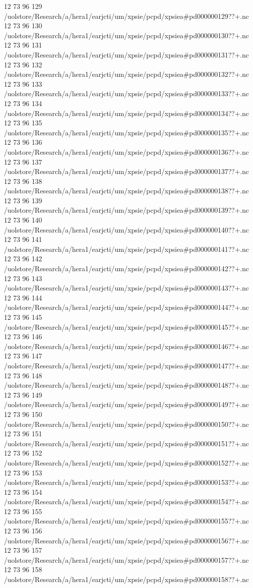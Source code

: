 12 73 96
129
/uolstore/Research/a/hera1/earjcti/um/xpsie/pcpd/xpsiea#pd000000129??+.nc
12 73 96
130
/uolstore/Research/a/hera1/earjcti/um/xpsie/pcpd/xpsiea#pd000000130??+.nc
12 73 96
131
/uolstore/Research/a/hera1/earjcti/um/xpsie/pcpd/xpsiea#pd000000131??+.nc
12 73 96
132
/uolstore/Research/a/hera1/earjcti/um/xpsie/pcpd/xpsiea#pd000000132??+.nc
12 73 96
133
/uolstore/Research/a/hera1/earjcti/um/xpsie/pcpd/xpsiea#pd000000133??+.nc
12 73 96
134
/uolstore/Research/a/hera1/earjcti/um/xpsie/pcpd/xpsiea#pd000000134??+.nc
12 73 96
135
/uolstore/Research/a/hera1/earjcti/um/xpsie/pcpd/xpsiea#pd000000135??+.nc
12 73 96
136
/uolstore/Research/a/hera1/earjcti/um/xpsie/pcpd/xpsiea#pd000000136??+.nc
12 73 96
137
/uolstore/Research/a/hera1/earjcti/um/xpsie/pcpd/xpsiea#pd000000137??+.nc
12 73 96
138
/uolstore/Research/a/hera1/earjcti/um/xpsie/pcpd/xpsiea#pd000000138??+.nc
12 73 96
139
/uolstore/Research/a/hera1/earjcti/um/xpsie/pcpd/xpsiea#pd000000139??+.nc
12 73 96
140
/uolstore/Research/a/hera1/earjcti/um/xpsie/pcpd/xpsiea#pd000000140??+.nc
12 73 96
141
/uolstore/Research/a/hera1/earjcti/um/xpsie/pcpd/xpsiea#pd000000141??+.nc
12 73 96
142
/uolstore/Research/a/hera1/earjcti/um/xpsie/pcpd/xpsiea#pd000000142??+.nc
12 73 96
143
/uolstore/Research/a/hera1/earjcti/um/xpsie/pcpd/xpsiea#pd000000143??+.nc
12 73 96
144
/uolstore/Research/a/hera1/earjcti/um/xpsie/pcpd/xpsiea#pd000000144??+.nc
12 73 96
145
/uolstore/Research/a/hera1/earjcti/um/xpsie/pcpd/xpsiea#pd000000145??+.nc
12 73 96
146
/uolstore/Research/a/hera1/earjcti/um/xpsie/pcpd/xpsiea#pd000000146??+.nc
12 73 96
147
/uolstore/Research/a/hera1/earjcti/um/xpsie/pcpd/xpsiea#pd000000147??+.nc
12 73 96
148
/uolstore/Research/a/hera1/earjcti/um/xpsie/pcpd/xpsiea#pd000000148??+.nc
12 73 96
149
/uolstore/Research/a/hera1/earjcti/um/xpsie/pcpd/xpsiea#pd000000149??+.nc
12 73 96
150
/uolstore/Research/a/hera1/earjcti/um/xpsie/pcpd/xpsiea#pd000000150??+.nc
12 73 96
151
/uolstore/Research/a/hera1/earjcti/um/xpsie/pcpd/xpsiea#pd000000151??+.nc
12 73 96
152
/uolstore/Research/a/hera1/earjcti/um/xpsie/pcpd/xpsiea#pd000000152??+.nc
12 73 96
153
/uolstore/Research/a/hera1/earjcti/um/xpsie/pcpd/xpsiea#pd000000153??+.nc
12 73 96
154
/uolstore/Research/a/hera1/earjcti/um/xpsie/pcpd/xpsiea#pd000000154??+.nc
12 73 96
155
/uolstore/Research/a/hera1/earjcti/um/xpsie/pcpd/xpsiea#pd000000155??+.nc
12 73 96
156
/uolstore/Research/a/hera1/earjcti/um/xpsie/pcpd/xpsiea#pd000000156??+.nc
12 73 96
157
/uolstore/Research/a/hera1/earjcti/um/xpsie/pcpd/xpsiea#pd000000157??+.nc
12 73 96
158
/uolstore/Research/a/hera1/earjcti/um/xpsie/pcpd/xpsiea#pd000000158??+.nc
